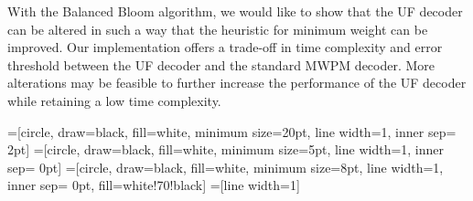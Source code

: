 \documentclass[11pt, a4paper, twoside, titlepage, usenames,dvipsnames]{report}
\begin{document}
With the Balanced Bloom algorithm, we would like to show that the UF decoder can be altered in such a way that the heuristic for minimum weight can be improved. Our implementation offers a trade-off in time complexity and error threshold between the UF decoder and the standard MWPM decoder. More alterations may be feasible to further increase the performance of the UF decoder while retaining a low time complexity.

\printbibliography

=[circle, draw=black, fill=white, minimum size=20pt, line width=1, inner sep= 2pt]
=[circle, draw=black, fill=white, minimum size=5pt, line width=1, inner sep= 0pt]
=[circle, draw=black, fill=white, minimum size=8pt, line width=1, inner sep= 0pt, fill=white!70!black]
=[line width=1]
\tikzfading[name=fade right, left color=transparent!0, right color=transparent!100]
\end{document}
